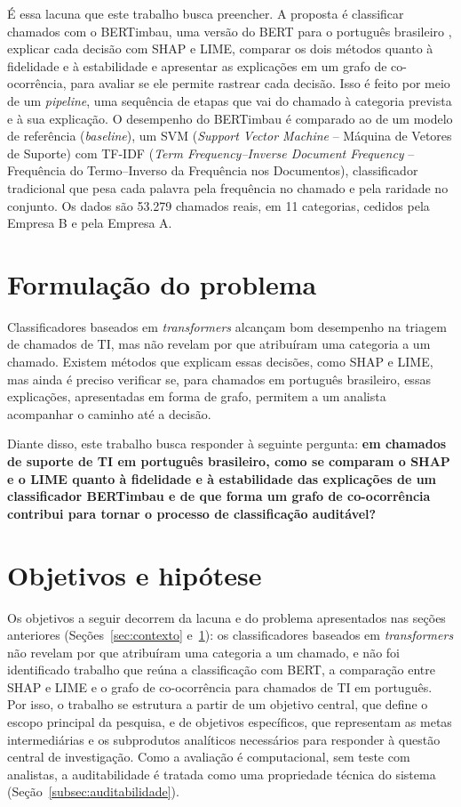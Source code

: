 \documentclass[
    12pt,                %
    openright,           %
    oneside,             %
    a4paper,             %
    english,             %
    brazil               %
]{abntex2}
\begin{document}
É essa lacuna que este trabalho busca preencher. A proposta é classificar chamados com o BERTimbau, uma versão do BERT para o português brasileiro \cite{souza2020}, explicar cada decisão com SHAP e LIME, comparar os dois métodos quanto à fidelidade e à estabilidade e apresentar as explicações em um grafo de co-ocorrência, para avaliar se ele permite rastrear cada decisão. Isso é feito por meio de um \textit{pipeline}, uma sequência de etapas que vai do chamado à categoria prevista e à sua explicação. O desempenho do BERTimbau é comparado ao de um modelo de referência (\textit{baseline}), um SVM (\textit{Support Vector Machine} -- Máquina de Vetores de Suporte) com TF-IDF (\textit{Term Frequency--Inverse Document Frequency} -- Frequência do Termo--Inverso da Frequência nos Documentos), classificador tradicional que pesa cada palavra pela frequência no chamado e pela raridade no conjunto. Os dados são 53.279 chamados reais, em 11 categorias, cedidos pela Empresa B e pela Empresa A.

\section{Formulação do problema}
\label{sec:problema}

Classificadores baseados em \textit{transformers} alcançam bom desempenho na triagem de chamados de TI, mas não revelam por que atribuíram uma categoria a um chamado. Existem métodos que explicam essas decisões, como SHAP e LIME, mas ainda é preciso verificar se, para chamados em português brasileiro, essas explicações, apresentadas em forma de grafo, permitem a um analista acompanhar o caminho até a decisão.

Diante disso, este trabalho busca responder à seguinte pergunta: 
\textbf{em chamados de suporte de TI em português brasileiro, como se comparam o 
SHAP e o LIME quanto à fidelidade e à estabilidade das explicações de um 
classificador BERTimbau e de que forma um grafo de co-ocorrência contribui para 
tornar o processo de classificação auditável?}

\section{Objetivos e hipótese}

Os objetivos a seguir decorrem da lacuna e do problema apresentados nas seções anteriores (Seções~\ref{sec:contexto} e~\ref{sec:problema}): os classificadores baseados em \textit{transformers} não revelam por que atribuíram uma categoria a um chamado, e não foi identificado trabalho que reúna a classificação com BERT, a comparação entre SHAP e LIME e o grafo de co-ocorrência para chamados de TI em português. Por isso, o trabalho se estrutura a partir de um objetivo central, que define o escopo principal da pesquisa, e de objetivos específicos, que representam as metas intermediárias e os subprodutos analíticos necessários para responder à questão central de investigação. Como a avaliação é computacional, sem teste com analistas, a auditabilidade é tratada como uma propriedade técnica do sistema (Seção~\ref{subsec:auditabilidade}).
\end{document}
